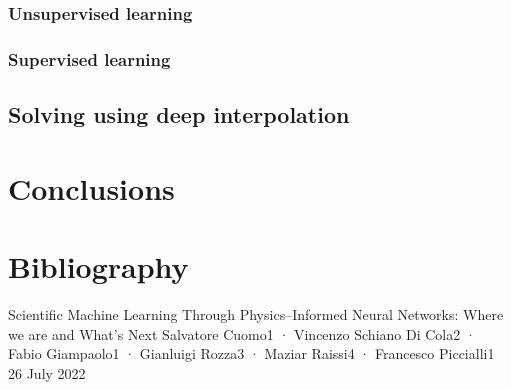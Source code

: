 \documentclass{article}
\begin{document}
\subsubsection{Unsupervised learning}


\subsubsection{Supervised learning}


\subsection{Solving using deep interpolation}



\section{Conclusions}


\section{Bibliography}
 {Scientific Machine Learning Through Physics–Informed Neural Networks: Where we are and What’s Next}
Salvatore Cuomo1 · Vincenzo Schiano Di Cola2 · Fabio Giampaolo1 · Gianluigi Rozza3 · Maziar Raissi4 · Francesco Piccialli1
26 July 2022
\end{document}

